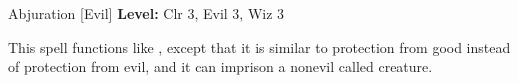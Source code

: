 {Abjuration [Evil]}
{
	\textbf{Level:}
	Clr 3, Evil 3, Wiz 3\\
}
{
	This spell functions like , except that it is similar to protection from good instead of protection from evil, and it can imprison a nonevil called creature.

}

